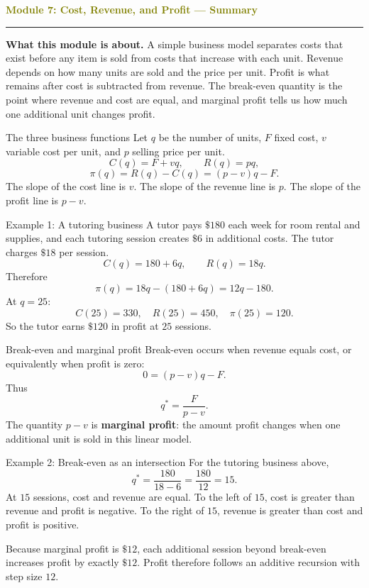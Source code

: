 \documentclass[11pt]{article}
\newcommand{\summaryhead}[2]{%
  \clearpage
  {\Large\bfseries\textcolor{olive}{Module #1: #2 — Summary}}\par
  \vspace{2pt}\textcolor{gold}{\rule{\linewidth}{1.2pt}}\par\smallskip
}
\begin{document}
\summaryhead{7}{Cost, Revenue, and Profit}

\textbf{What this module is about.} A simple business model separates costs that exist before any item is sold from costs that increase with each unit. Revenue depends on how many units are sold and the price per unit. Profit is what remains after cost is subtracted from revenue. The break-even quantity is the point where revenue and cost are equal, and marginal profit tells us how much one additional unit changes profit.

\begin{keybox}{The three business functions}
Let \(q\) be the number of units, \(F\) fixed cost, \(v\) variable cost per unit, and \(p\) selling price per unit.
\[
C(q)=F+vq,
\qquad
R(q)=pq,
\]
\[
\pi(q)=R(q)-C(q)=(p-v)q-F.
\]
The slope of the cost line is \(v\). The slope of the revenue line is \(p\). The slope of the profit line is \(p-v\).
\end{keybox}

\begin{examplebox}{Example 1: A tutoring business}
A tutor pays \(\$180\) each week for room rental and supplies, and each tutoring session creates \(\$6\) in additional costs. The tutor charges \(\$18\) per session.
\[
C(q)=180+6q,
\qquad
R(q)=18q.
\]
Therefore
\[
\pi(q)=18q-(180+6q)=12q-180.
\]
At \(q=25\):
\[
C(25)=330,
\quad
R(25)=450,
\quad
\pi(25)=120.
\]
So the tutor earns \(\$120\) in profit at \(25\) sessions.
\end{examplebox}

\begin{keybox}{Break-even and marginal profit}
Break-even occurs when revenue equals cost, or equivalently when profit is zero:
\[
0=(p-v)q-F.
\]
Thus
\[
q^*=\frac{F}{p-v}.
\]
The quantity \(p-v\) is \textbf{marginal profit}: the amount profit changes when one additional unit is sold in this linear model.
\end{keybox}

\begin{examplebox}{Example 2: Break-even as an intersection}
For the tutoring business above,
\[
q^*=\frac{180}{18-6}=\frac{180}{12}=15.
\]
At \(15\) sessions, cost and revenue are equal. To the left of \(15\), cost is greater than revenue and profit is negative. To the right of \(15\), revenue is greater than cost and profit is positive.

Because marginal profit is \(\$12\), each additional session beyond break-even increases profit by exactly \(\$12\). Profit therefore follows an additive recursion with step size \(12\).
\end{examplebox}
\end{document}
